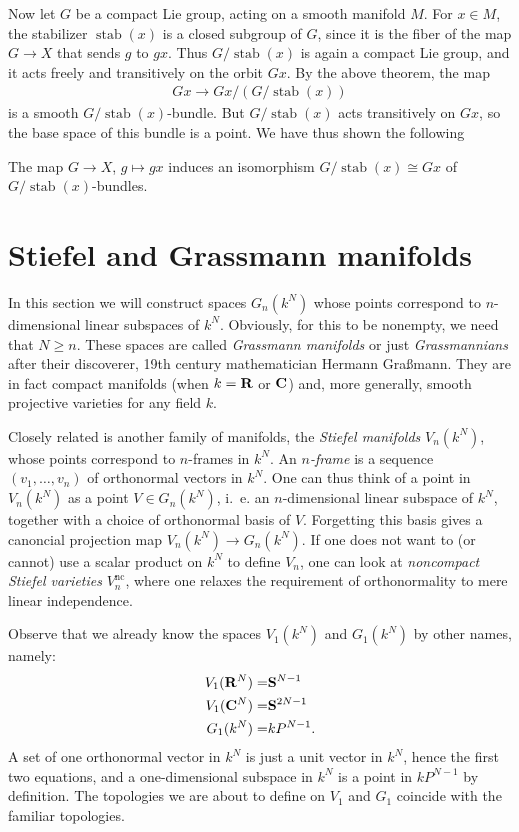 \documentclass[a4paper,openany]{scrbook}
\DeclareMathOperator{\stab}{stab}
\begin{document}
Now let $G$ be a compact Lie group, acting on a smooth manifold $M$. For $x \in M$, the stabilizer $\stab(x)$ is a closed subgroup of $G$, since it is the fiber of the map $G \to X$ that sends $g$ to $gx$. Thus $G/ \stab(x)$ is again a compact Lie group, and it acts freely and transitively on the orbit $Gx$. By the above theorem, the map
\begin{align*}
Gx \to Gx / (G/\stab(x))
\end{align*}
is a smooth $G/\stab(x)$-bundle. But $G/\stab(x)$ acts transitively on $Gx$, so the base space of this bundle is a point. We have thus shown the following
\begin{corollary}
	The map $G \to X$, $g \mapsto gx$ induces an isomorphism $G/\stab(x) \cong Gx$ of $G/\stab(x)$-bundles.
\end{corollary}	


\section{Stiefel and Grassmann manifolds}

In this section we will construct spaces $G_n(k^N)$ whose points correspond to $n$-dimensional linear subspaces of $k^N$. Obviously, for this to be nonempty, we need that $N \geq n$. These spaces are called \emph{Grassmann manifolds} or just \emph{Grassmannians} after their discoverer, 19th century mathematician Hermann Graßmann. They are in fact compact manifolds (when $k=\mathbf R$ or $\mathbf C$) and, more generally, smooth projective varieties for any field $k$.

Closely related is another family of manifolds, the \emph{Stiefel manifolds} $V_n(k^N)$, whose points correspond to $n$-frames in $k^N$. An \emph{$n$-frame} is a sequence $(v_1,\dots,v_n)$ of orthonormal vectors in $k^N$. One can thus think of a point in $V_n(k^N)$ as a point $V \in G_n(k^N)$, i.~e. an $n$-dimensional linear subspace of $k^N$, together with a choice of orthonormal basis of $V$. Forgetting this basis gives a canoncial projection map $V_n(k^N) \to G_n(k^N)$. If one does not want to (or cannot) use a scalar product on $k^N$ to define $V_n$, one can look at \emph{noncompact Stiefel varieties} $V_n^{\operatorname{nc}}$, where one relaxes the requirement of orthonormality to mere linear independence.

Observe that we already know the spaces $V_1(k^N)$ and $G_1(k^N)$ by other names, namely:
\begin{eqnarray*}
V_1(\mathbf R^{N}) =& \mathbf S^{N-1}\\
V_1(\mathbf C^N) =& \mathbf S^{2N-1}\\
G_1(k^N) =& k P^{N-1}.
\end{eqnarray*}
A set of one orthonormal vector in $k^N$ is just a unit vector in $k^N$, hence the first two equations, and a one-dimensional subspace in $k^N$ is a point in $k P^{N-1}$ by definition. The topologies we are about to define on $V_1$ and $G_1$ coincide with the familiar topologies.
\end{document}
